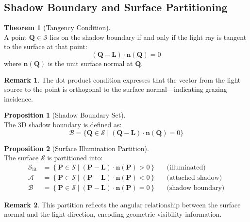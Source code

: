 \documentclass[12pt]{article}
\newcommand{\vect}[1]{\bm{#1}}
\theoremstyle{definition}
\newtheorem{theorem}{Theorem}[section]
\newtheorem{proposition}{Proposition}[section]
\newtheorem{remark}{Remark}[section]
\begin{document}
\subsection{Shadow Boundary and Surface Partitioning}

\begin{theorem}[Tangency Condition] ~\\
A point $\vect{Q} \in \mathcal{S}$ lies on the shadow boundary if and only if the light ray is tangent to the surface at that point:
\begin{equation}
\boxed{(\vect{Q} - \vect{L}) \cdot \vect{n}(\vect{Q}) = 0} \label{eq:tangency}
\end{equation}
where $\vect{n}(\vect{Q})$ is the unit surface normal at $\vect{Q}$.
\end{theorem}

\begin{remark}
The dot product condition expresses that the vector from the light source to the point is orthogonal to the surface normal—indicating grazing incidence.
\end{remark}

\begin{proposition}[Shadow Boundary Set] ~\\
The 3D shadow boundary is defined as:
\begin{equation}
\boxed{\mathcal{B} = \{\vect{Q} \in \mathcal{S} \mid (\vect{Q} - \vect{L}) \cdot \vect{n}(\vect{Q}) = 0\}} \label{eq:boundary_set}
\end{equation}
\end{proposition}

\begin{proposition}[Surface Illumination Partition] ~\\
The surface $\mathcal{S}$ is partitioned into:
\begin{align}
\mathcal{S}_{\text{lit}} &= \left\{ \vect{P} \in \mathcal{S} \mid (\vect{P} - \vect{L}) \cdot \vect{n}(\vect{P}) > 0 \right\} && \text{(illuminated)} \\
\mathcal{A} &= \left\{ \vect{P} \in \mathcal{S} \mid (\vect{P} - \vect{L}) \cdot \vect{n}(\vect{P}) < 0 \right\} && \text{(attached shadow)} \\
\mathcal{B} &= \left\{ \vect{P} \in \mathcal{S} \mid (\vect{P} - \vect{L}) \cdot \vect{n}(\vect{P}) = 0 \right\} && \text{(shadow boundary)}
\end{align}
\end{proposition}

\begin{remark}
This partition reflects the angular relationship between the surface normal and the light direction, encoding geometric visibility information.
\end{remark}
\end{document}
